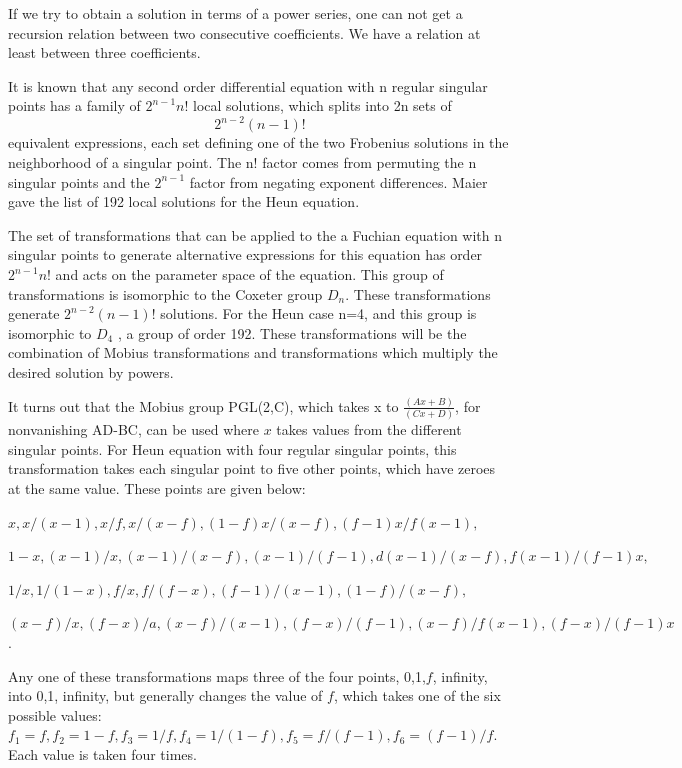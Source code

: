 \documentclass{article}
\begin{document}
If we try to obtain a solution in terms of a power series, one can
not get a recursion relation between two consecutive coefficients.
We have a relation at least between three coefficients.

\noindent
 It is known that \cite{maier2}  any second order
differential equation with n regular singular points has a family
of $2^{n-1} n!$ local solutions, which splits into 2n sets of
$$2^{n-2} (n-1)!$$ equivalent expressions, each set defining one of
the two Frobenius solutions in the neighborhood of a singular
point. The n! factor comes from permuting the n singular points
and the $2^{n-1}$ factor from negating exponent differences. Maier
\cite{maier2} gave the list of 192 local solutions for the
Heun equation.


\noindent The set of transformations that can be applied to the a
Fuchian equation with n singular points to generate alternative
expressions for this equation has order $2^{n-1} n!$ and acts on
the parameter space of the equation. This group of transformations
is isomorphic to the Coxeter group $D_n$. These transformations
generate $2^{n-2} (n-1)!$ solutions. For the Heun case n=4, and
this group is isomorphic to $D_4$ , a group of order 192. These
transformations will be the combination of Mobius transformations
and transformations which multiply the desired solution by powers.


\noindent It turns out that the Mobius group PGL(2,C), which
takes x to $\frac {(Ax+B)} {(Cx+D)}$, for nonvanishing AD-BC, can
be used where $x$ takes values from the different singular points.
For Heun equation with four regular singular points, this
transformation takes each singular point to five other points,
which have zeroes at the same value. These points are given below:


\noindent $x, x/(x - 1), x/f, x/(x - f), (1 - f)x/(x - f), (f -
1)x/f(x - 1) ,$


\noindent $1 - x, (x - 1)/x,( x - 1)/(x - f), (x - 1)/(f - 1), d(x
- 1)/(x - f), f(x - 1)/(f - 1)x,$


\noindent $1/x, 1/(1 - x), f/x, f/(f - x), (f - 1)/(x - 1), (1 -
f)/(x - f),$


\noindent $(x - f)/x, (f - x)/a, (x - f)/(x - 1), (f - x)/(f - 1),
(x - f)/f(x - 1) , (f - x)/(f - 1)x$.


\noindent Any one of these transformations maps three of the four
points, 0,1,$f$, infinity, into 0,1, infinity, but generally
changes the value of $f$, which takes one of the six possible
values: $ f_1 = f, f_2 = 1-f, f_3 = 1/f, f_4 = 1/(1-f), f_5 =
f/(f-1), f_6=(f-1)/f $. Each value is taken four times.
\end{document}

